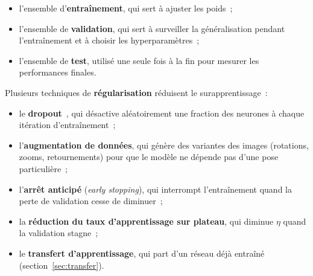 \begin{itemize}
  \item l’ensemble d’\textbf{entraînement}, qui sert à ajuster les poids~;
  \item l’ensemble de \textbf{validation}, qui sert à surveiller la généralisation pendant l’entraînement et à choisir les hyperparamètres~;
  \item l’ensemble de \textbf{test}, utilisé une seule fois à la fin pour mesurer les performances finales.
\end{itemize}

Plusieurs techniques de \textbf{régularisation} réduisent le surapprentissage~:

\begin{itemize}
  \item le \textbf{dropout}~\cite{srivastava2014}, qui désactive aléatoirement une fraction des neurones à chaque itération d’entraînement~;
  \item l’\textbf{augmentation de données}, qui génère des variantes des images (rotations, zooms, retournements) pour que le modèle ne dépende pas d’une pose particulière~;
  \item l’\textbf{arrêt anticipé} (\emph{early stopping}), qui interrompt l’entraînement quand la perte de validation cesse de diminuer~;
  \item la \textbf{réduction du taux d’apprentissage sur plateau}, qui diminue $\eta$ quand la validation stagne~;
  \item le \textbf{transfert d’apprentissage}, qui part d’un réseau déjà entraîné (section~\ref{sec:transfer}).
\end{itemize}
